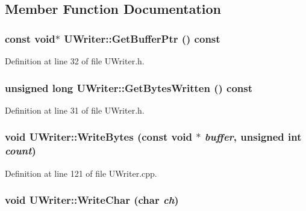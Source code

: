 \subsection{Member Function Documentation}
\hypertarget{class_u_writer_9bd5aca0223d14eea6a715449e613300}{
\subsubsection[{GetBufferPtr}]{\setlength{\rightskip}{0pt plus 5cm}const void$\ast$ UWriter::GetBufferPtr () const}}
\label{class_u_writer_9bd5aca0223d14eea6a715449e613300}




Definition at line 32 of file UWriter.h.\hypertarget{class_u_writer_362bb4a3c111c793e22927a6b26afe0c}{
\subsubsection[{GetBytesWritten}]{\setlength{\rightskip}{0pt plus 5cm}unsigned long UWriter::GetBytesWritten () const}}
\label{class_u_writer_362bb4a3c111c793e22927a6b26afe0c}




Definition at line 31 of file UWriter.h.\hypertarget{class_u_writer_db6161ee8139f7215bddb0c0e9f7f427}{
\subsubsection[{WriteBytes}]{\setlength{\rightskip}{0pt plus 5cm}void UWriter::WriteBytes (const void $\ast$ {\em buffer}, \/  unsigned int {\em count})}}
\label{class_u_writer_db6161ee8139f7215bddb0c0e9f7f427}




Definition at line 121 of file UWriter.cpp.\hypertarget{class_u_writer_3c706400f5fe0fe26cd8ebfe5a55d13a}{
\subsubsection[{WriteChar}]{\setlength{\rightskip}{0pt plus 5cm}void UWriter::WriteChar (char {\em ch})}}
\label{class_u_writer_3c706400f5fe0fe26cd8ebfe5a55d13a}




